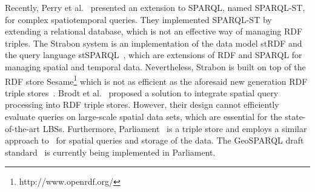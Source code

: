 
Recently, Perry et al.~\cite{Perry11} presented an extension to
SPARQL, named SPARQL-ST, for complex spatiotemporal queries. They
implemented SPARQL-ST by extending a relational database, which is
not an effective way of managing RDF triples. The Strabon system
is an implementation of the data model stRDF and the query
language stSPARQL~\cite{conf/esws/KoubarakisK10}, which are
extensions of RDF and SPARQL for managing spatial and temporal
data. Nevertheless, Strabon is built on top of the RDF store
Sesame\footnote{http://www.openrdf.org/} which is not as efficient
as the aforesaid new generation RDF triple
stores~\cite{KyzirakosKK10}. Brodt et
al.~\cite{conf/gis/BrodtNM10} proposed a solution to integrate
spatial query processing into RDF triple stores. However, their
design cannot efficiently evaluate queries on large-scale spatial
data sets, which are essential for the state-of-the-art LBSs.
Furthermore, Parliament~\cite{conf/SSWS09,conf/semweb/KolasS07} is
a triple store and employs a similar approach
to~\cite{conf/gis/BrodtNM10} for spatial queries and storage of
the data. The GeoSPARQL draft standard~\cite{GeoSPARQL} is
currently being implemented in Parliament.

